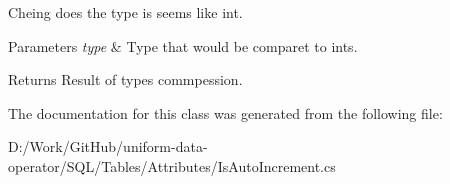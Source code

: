 Cheing does the type is seems like int. 


\begin{DoxyParams}{Parameters}
{\em type} & Type that would be comparet to ints.\\
\hline
\end{DoxyParams}
\begin{DoxyReturn}{Returns}
Result of types commpession.
\end{DoxyReturn}


The documentation for this class was generated from the following file\+:\begin{DoxyCompactItemize}
\item 
D\+:/\+Work/\+Git\+Hub/uniform-\/data-\/operator/\+S\+Q\+L/\+Tables/\+Attributes/Is\+Auto\+Increment.\+cs\end{DoxyCompactItemize}

